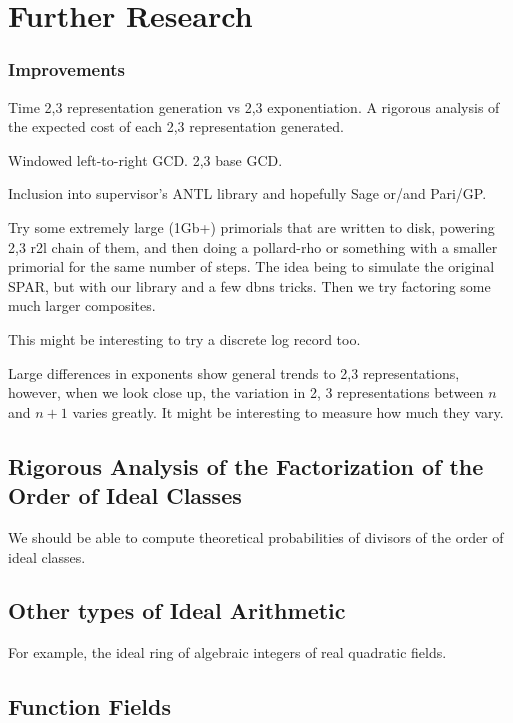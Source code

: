 \documentclass{ucalgthes1}
\theoremstyle{definition}
\begin{document}
\chapter{Further Research}

\subsection{Improvements}

Time 2,3 representation generation vs 2,3 exponentiation.
A rigorous analysis of the expected cost of each 2,3 representation generated.

Windowed left-to-right GCD.
2,3 base GCD.

Inclusion into supervisor's ANTL library and hopefully Sage or/and Pari/GP.

Try some extremely large (1Gb+) primorials that are written to disk, powering 2,3 r2l chain of them, and then doing a pollard-rho or something with a smaller primorial for the same number of steps.  The idea being to simulate the original SPAR, but with our library and a few dbns tricks.  Then we try factoring some much larger composites.

This might be interesting to try a discrete log record too.

Large differences in exponents show general trends to 2,3 representations, however, when we look close up, the variation in 2, 3 representations between $n$ and $n+1$ varies greatly.  It might be interesting to measure how much they vary.  

\section{Rigorous Analysis of the Factorization of the Order of Ideal Classes}

We should be able to compute theoretical probabilities of divisors of the order of ideal classes.

\section{Other types of Ideal Arithmetic}
For example, the ideal ring of algebraic integers of real quadratic fields.

\section{Function Fields}
\end{document}
